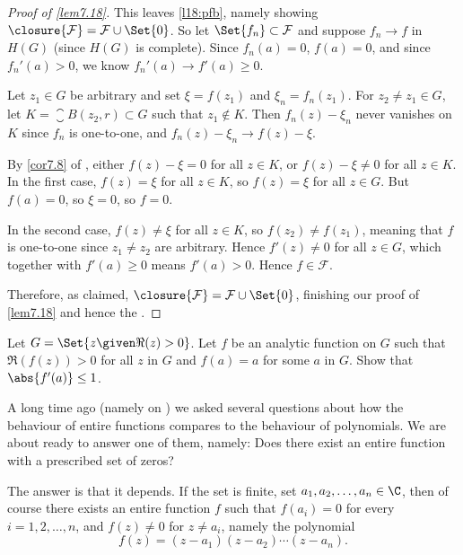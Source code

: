 \begin{proof}[Proof of \autoref{lem7.18}]
	This leaves \ref{l18:pfb}, namely showing $\closure{\mathcal{F}} = \mathcal{F} \cup \Set{0}$.
	So let $\Set{f_n} \subset \mathcal{F}$ and suppose $f_n \to f$ in $H(G)$ (since $H(G)$ is complete).
	Since $f_n(a) = 0$, $f(a) = 0$, and since $f_n'(a) > 0$, we know $f_n'(a) \to f'(a) \geq 0$.

	Let $z_1 \in G$ be arbitrary and set $\xi = f(z_1)$ and $\xi_n = f_n(z_1)$.
	For $z_2 \neq z_1 \in G$, let $K = \closure{B(z_2, r)} \subset G$ such that $z_1 \not\in K$.
	Then $f_n(z) - \xi_n$ never vanishes on $K$ since $f_n$ is one-to-one, and $f_n(z) - \xi_n \to f(z) - \xi$.

	By \autoref{cor7.8} of , either $f(z) - \xi = 0$ for all $z \in K$, or $f(z) - \xi \neq 0$ for all $z \in K$.
	In the first case, $f(z) = \xi$ for all $z \in K$, so $f(z) = \xi$ for all $z \in G$.
	But $f(a) = 0$, so $\xi = 0$, so $f = 0$.

	In the second case, $f(z) \neq \xi$ for all $z \in K$, so $f(z_2) \neq f(z_1)$, meaning that $f$ is one-to-one since $z_1 \neq z_2$ are arbitrary.
	Hence $f'(z) \neq 0$ for all $z \in G$, which together with $f'(a) \geq 0$ means $f'(a) > 0$.
	Hence $f \in \mathcal{F}$.

	Therefore, as claimed, $\closure{\mathcal{F}} = \mathcal{F} \cup \Set{0}$, finishing our proof of \autoref{lem7.18} and hence the .
\end{proof}

\begin{exercise}
	Let $G = \Set{z \given \Re(z) > 0}$.
	Let $f$ be an analytic function on $G$ such that $\Re(f(z)) > 0$ for all $z$ in $G$ and $f(a) = a$ for some $a$ in $G$.
	Show that $\abs{f'(a)} \leq 1$.
\end{exercise}

\label{lec18:entire}

A long time ago (namely on ) we asked several questions about how the behaviour of entire functions compares to the behaviour of polynomials.
We are about ready to answer one of them, namely:
Does there exist an entire function with a prescribed set of zeros?

The answer is that it depends.
If the set is finite, set $a_1, a_2, \dots, a_n \in \C$, then of course there exists an entire function $f$ such that $f(a_i) = 0$ for every $i = 1, 2, \dots, n$, and $f(z) \neq 0$ for $z \neq a_i$, namely the polynomial
\[
	f(z) = (z - a_1) (z - a_2) \dotsm (z - a_n).
\]

